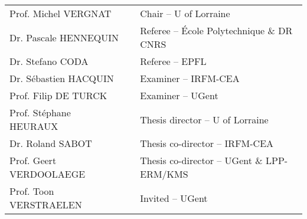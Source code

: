 \begin{titlepage}
\begin{center}
\begin{tabular}{lcl}
Prof. Michel \textsc{VERGNAT} & \hspace{0cm} & Chair -- U of Lorraine \\
Dr. Pascale \textsc{HENNEQUIN} & \hspace{0cm} & Referee -- \'{E}cole Polytechnique \& DR CNRS \\
Dr. Stefano \textsc{CODA} & \hspace{0cm} & Referee -- EPFL \\
Dr. S\'{e}bastien \textsc{HACQUIN}  & \hspace{0cm} & Examiner  -- IRFM-CEA \\
Prof. Filip \textsc{DE TURCK} & \hspace{0cm} & Examiner --  UGent \\
Prof. St\'{e}phane \textsc{HEURAUX} & \hspace{0cm} & Thesis director -- U of Lorraine \\
Dr. Roland \textsc{SABOT}  & \hspace{0cm} & Thesis co-director -- IRFM-CEA \\
Prof. Geert \textsc{VERDOOLAEGE} & \hspace{0cm} & Thesis co-director -- UGent \& LPP-ERM/KMS \\
Prof. Toon \textsc{VERSTRAELEN} & \hspace{0cm} & Invited -- UGent \\


\hline
\end{tabular}




\vspace{.7cm}




\end{center}
\end{titlepage}
